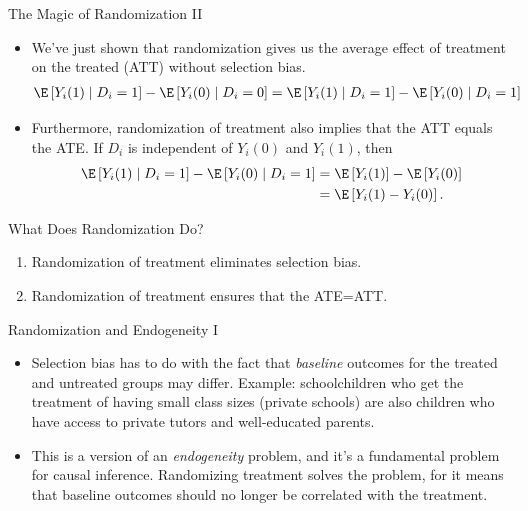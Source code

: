 \documentclass[aspectratio=169,11pt]{beamer}
\begin{document}
\begin{frame}{The Magic of Randomization II}
\begin{itemize}
  \item We've just shown that randomization gives us the average effect of treatment on the treated (ATT)
  without selection bias.
  \begin{align*}
    \E\left[Y_{i}(1) \mid D_{i}=1\right]-\E\left[Y_{i}(0) \mid D_{i}=0\right]=\E\left[Y_{i}(1)\mid D_{i}=1\right]-\E\left[Y_{i}(0) \mid D_{i}=1\right]
  \end{align*}

  \medskip
  \item Furthermore, randomization of treatment also implies that the ATT equals
  the ATE. If $D_{i}$ is independent of $Y_{i}(0)$ and $Y_{i}(1)$, then
  \begin{align*}
\E\left[Y_{i}(1) \mid D_{i}=1\right]-\E\left[Y_{i}(0) \mid D_{i}=1\right]
&=\E\left[Y_{i}(1)\right]-\E\left[Y_{i}(0)\right]\\
&= \E\left[Y_{i}(1) - Y_{i}(0)\right].
\end{align*}

\end{itemize}
\end{frame}

\begin{frame}{What Does Randomization Do?}
\begin{enumerate}
  \item Randomization of treatment eliminates selection bias.

  \item Randomization of treatment ensures that the ATE=ATT.
\end{enumerate}
\end{frame}


\begin{frame}{Randomization and Endogeneity I}
\begin{itemize}
  \item Selection bias has to do with the fact that \emph{baseline} outcomes for the treated
  and untreated groups may differ. Example: schoolchildren who get the treatment of having
  small class sizes (private schools) are also children who have access to private tutors and well-educated parents.

  \medskip
\item This is a version of an \emph{endogeneity} problem, and it's a fundamental problem for causal inference.
  Randomizing treatment solves the problem, for it means that baseline outcomes should no longer be correlated with the treatment.
\end{itemize}
\end{frame}
\end{document}
